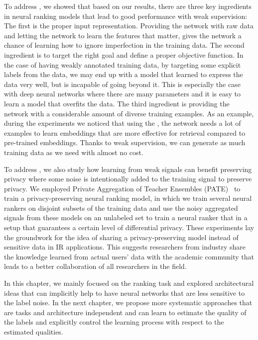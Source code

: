 To address \textbf{}, we showed that based on our results, there are three key ingredients in neural ranking models that lead to good performance with weak supervision:
%
The first is the proper input representation. Providing the network with raw data and letting the network to learn the features that matter, gives the network a chance of learning how to ignore imperfection in the training data.
%
The second ingredient is to target the right goal and define a proper objective function. In the case of having weakly annotated training data, by targeting some explicit labels from the data, we may end up with a model that learned to express the data very well, but is incapable of going beyond it. 
This is especially the case with deep neural networks where there are many parameters and it is easy to learn a model that overfits the data.
%
The third ingredient is providing the network with a considerable amount of diverse training examples. 
As an example, during the experiments we noticed that using the \feedthree, the network needs a lot of examples to learn embeddings that are more effective for retrieval compared to pre-trained embeddings. 
Thanks to weak supervision, we can generate as much training data as we need with almost no cost.

To address \textbf{}, we also study how learning from weak signals can benefit preserving privacy where some noise is intentionally added to the training signal to preserve privacy. We employed Private Aggregation of Teacher Ensembles (PATE)~\citep{Papernot:2017}  to train a privacy-preserving neural ranking model, in which we train several neural rankers on disjoint subsets of the training data and use the noisy aggregated signals from these models on an unlabeled set to train a neural ranker that in a setup that guarantees a certain level of differential privacy.
These experiments lay the groundwork for the idea of sharing a privacy-preserving model instead of sensitive data in IR applications. This suggests researchers from industry share the knowledge learned from actual users' data with the academic community that leads to a better collaboration of all researchers in the field. 

In this chapter, we mainly focused on the ranking task and explored architectural ideas that can implicitly help to have neural networks that are less sensitive to the label noise.  
In the next chapter, we propose more systematic approaches that are tasks and architecture independent and can learn to estimate the quality of the labels and explicitly control the learning process with respect to the estimated qualities.